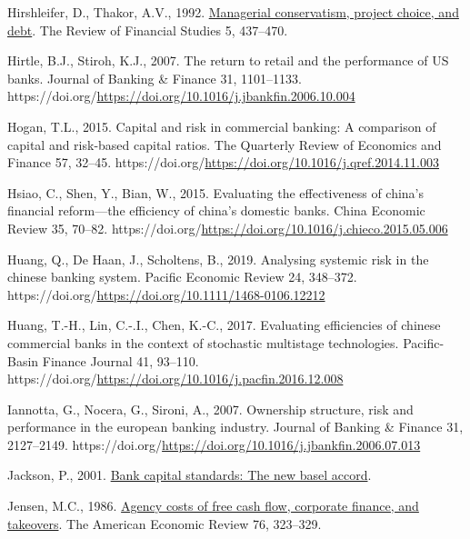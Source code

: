 \documentclass[
  12pt,
  a4paper,
]{scrreprt}
\newlength{\cslhangindent}
\newenvironment{CSLReferences}[2] %
 {\begin{list}{}{%
  \setlength{\itemindent}{0pt}
  \setlength{\leftmargin}{0pt}
  \setlength{\parsep}{0pt}
  \ifodd #1
   \setlength{\leftmargin}{\cslhangindent}
   \setlength{\itemindent}{-1\cslhangindent}
  \fi
  \setlength{\itemsep}{#2\baselineskip}}}
 {\end{list}}
\begin{document}
\begin{CSLReferences}{1}{0}
Hirshleifer, D., Thakor, A.V., 1992.
\href{http://www.jstor.org.queens.ezp1.qub.ac.uk/stable/2962134}{Managerial
conservatism, project choice, and debt}. The Review of Financial Studies
5, 437--470.

Hirtle, B.J., Stiroh, K.J., 2007. The return to retail and the
performance of US banks. Journal of Banking \& Finance 31, 1101--1133.
https://doi.org/\url{https://doi.org/10.1016/j.jbankfin.2006.10.004}

Hogan, T.L., 2015. Capital and risk in commercial banking: A comparison
of capital and risk-based capital ratios. The Quarterly Review of
Economics and Finance 57, 32--45.
https://doi.org/\url{https://doi.org/10.1016/j.qref.2014.11.003}

Hsiao, C., Shen, Y., Bian, W., 2015. Evaluating the effectiveness of
china's financial reform---the efficiency of china's domestic banks.
China Economic Review 35, 70--82.
https://doi.org/\url{https://doi.org/10.1016/j.chieco.2015.05.006}

Huang, Q., De Haan, J., Scholtens, B., 2019. Analysing systemic risk in
the chinese banking system. Pacific Economic Review 24, 348--372.
https://doi.org/\url{https://doi.org/10.1111/1468-0106.12212}

Huang, T.-H., Lin, C.-.I., Chen, K.-C., 2017. Evaluating efficiencies of
chinese commercial banks in the context of stochastic multistage
technologies. Pacific-Basin Finance Journal 41, 93--110.
https://doi.org/\url{https://doi.org/10.1016/j.pacfin.2016.12.008}

Iannotta, G., Nocera, G., Sironi, A., 2007. Ownership structure, risk
and performance in the european banking industry. Journal of Banking \&
Finance 31, 2127--2149.
https://doi.org/\url{https://doi.org/10.1016/j.jbankfin.2006.07.013}

Jackson, P., 2001.
\href{https://www.bankofengland.co.uk/quarterly-bulletin/2001/q1/2001-bank-capital-standards-the-new-basel-accord}{Bank
capital standards: The new basel accord}.

Jensen, M.C., 1986.
\href{http://www.jstor.org.queens.ezp1.qub.ac.uk/stable/1818789}{Agency
costs of free cash flow, corporate finance, and takeovers}. The American
Economic Review 76, 323--329.


\end{CSLReferences}
\end{document}
